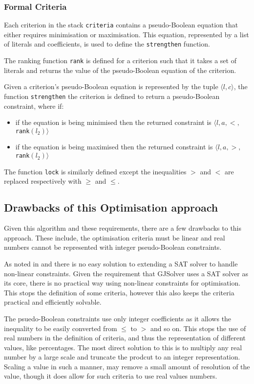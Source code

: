 \subsubsection{Formal Criteria}
Each criterion in the stack \verb+criteria+ contains a pseudo-Boolean equation that either requires minimisation or maximisation.
This equation, represented by a list of literals and coefficients, is used to define the \verb+strengthen+ function.

The ranking function \verb+rank+ is defined for a criterion such that it takes a set of literals and returns the value of the pseudo-Boolean equation of the criterion.

Given a criterion's pseudo-Boolean equation is represented by the tuple $\langle l, c \rangle$,
the function \verb+strengthen+ the criterion is defined to return a pseudo-Boolean constraint, where if:
\begin{itemize}
  \item if the equation is being minimised then the returned constraint is $\langle l,a,<,$\verb+rank+$(l_2) \rangle$
  \item if the equation is being maximised then the returned constraint is $\langle l,a,>,$\verb+rank+$(l_2) \rangle$
\end{itemize}
The function \verb+lock+ is similarly defined except the inequalities $>$ and $<$ are replaced respectively with $\geq$ and $\leq$.

\subsection{Drawbacks of this Optimisation approach}
Given this algorithm and these requirements, there are a few drawbacks to this approach.
These include, the optimisation criteria must be linear and real numbers cannot be represented with integer pseudo-Boolean constraints.

As noted in \cite{le_berre_dependency_2009} and \cite{leBerre2010} there is no easy solution to extending a SAT solver to handle non-linear constraints.
Given the requirement that GJSolver uses a SAT solver as its core, there is no practical way using non-linear constraints for optimisation.
This stops the definition of some criteria, however this also keeps the criteria practical and efficiently solvable.   

The psuedo-Boolean constraints use only integer coefficients as it allows the inequality to be easily converted from $\leq$ to $>$ and so on.
This stops the use of real numbers in the definition of criteria, and thus the representation of different values, like percentages.
The most direct solution to this is to multiply any real number by a large scale and truncate the prodcut to an integer representation.
Scaling a value in such a manner, may remove a small amount of resolution of the value, though it does allow for such criteria to use real values numbers.

